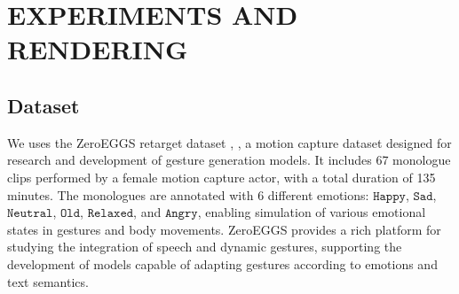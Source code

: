 








\section{EXPERIMENTS AND RENDERING}
\label{sec:results}


\subsection{Dataset}



We uses the ZeroEGGS retarget dataset \cite{ghorbani2022zeroeggs}, \cite{ghorbani2022zeroeggszeroshotexamplebasedgesture}, a motion capture dataset designed for research and development of gesture generation models. It includes 67 monologue clips performed by a female motion capture actor, with a total duration of 135 minutes. The monologues are annotated with 6 different emotions: $\texttt{Happy}$, $\texttt{Sad}$, $\texttt{Neutral}$, $\texttt{Old}$, $\texttt{Relaxed}$, and $\texttt{Angry}$, enabling simulation of various emotional states in gestures and body movements. ZeroEGGS provides a rich platform for studying the integration of speech and dynamic gestures, supporting the development of models capable of adapting gestures according to emotions and text semantics.

